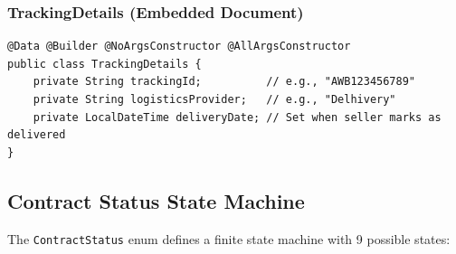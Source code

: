 \documentclass[11pt, a4paper]{article}
\begin{document}
\subsubsection{TrackingDetails (Embedded Document)}

\begin{lstlisting}[caption={TrackingDetails.java}]
@Data @Builder @NoArgsConstructor @AllArgsConstructor
public class TrackingDetails {
    private String trackingId;          // e.g., "AWB123456789"
    private String logisticsProvider;   // e.g., "Delhivery"
    private LocalDateTime deliveryDate; // Set when seller marks as delivered
}
\end{lstlisting}

\subsection{Contract Status State Machine}

The \texttt{ContractStatus} enum defines a finite state machine with 9 possible states:
\end{document}
